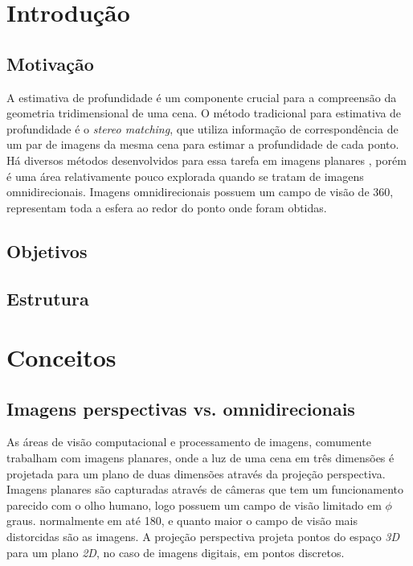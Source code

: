 \documentclass[cic,tc]{iiufrgs}
\begin{document}
\tableofcontents


\chapter{Introdução}

\section{Motivação}

A estimativa de profundidade é um componente crucial para a compreensão da geometria tridimensional de uma cena. O método tradicional para estimativa de profundidade é o \textit{stereo matching}, que utiliza informação de correspondência de um par de imagens da mesma cena para estimar a profundidade de cada ponto.  Há diversos métodos desenvolvidos para essa tarefa em imagens planares , porém é uma área relativamente pouco explorada quando se tratam de imagens omnidirecionais. Imagens omnidirecionais possuem um campo de visão de 360\degree, representam toda a esfera ao redor do ponto onde foram obtidas.

\section{Objetivos}

\section{Estrutura}

\chapter{Conceitos}

\section{Imagens perspectivas vs. omnidirecionais}

As áreas de visão computacional e processamento de imagens, comumente trabalham com imagens planares, onde a luz de uma cena em três dimensões é projetada para um plano de duas dimensões através da projeção perspectiva. Imagens planares são capturadas através de câmeras que tem um funcionamento parecido com o olho humano, logo possuem um campo de visão limitado em $\phi$ graus. normalmente em até 180\degree, e quanto maior o campo de visão mais distorcidas são as imagens. A projeção perspectiva projeta pontos do espaço \textit{3D} para um plano \textit{2D}, no caso de imagens digitais, em pontos discretos. 
\end{document}
